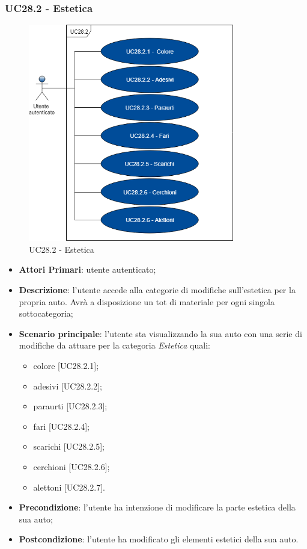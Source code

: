 \subsubsection{UC28.2 - Estetica}
\begin{figure}[h]
	\includegraphics[width=9cm]{res/images/UC26-2Estetica.png}
	\centering
	\caption{UC28.2 - Estetica}
\end{figure}
\begin{itemize}
	\item \textbf{Attori Primari}: utente autenticato;
	\item \textbf{Descrizione}: l'utente accede alla categorie di modifiche sull'estetica per la propria auto. Avrà a disposizione un tot di materiale per ogni singola sottocategoria;
	\item \textbf{Scenario principale}: l'utente sta visualizzando la sua auto con una serie di modifiche da attuare per la categoria \textit{Estetica} quali:
	\begin{itemize}
		\item colore [UC28.2.1];
		\item adesivi [UC28.2.2];
		\item paraurti [UC28.2.3];
		\item fari [UC28.2.4];
		\item scarichi [UC28.2.5];
		\item cerchioni [UC28.2.6];
		\item alettoni [UC28.2.7].
	\end{itemize}
	\item \textbf{Precondizione}: l'utente ha intenzione di modificare la parte estetica della sua auto;
	\item \textbf{Postcondizione}: l'utente ha modificato gli elementi estetici della sua auto.
\end{itemize}

